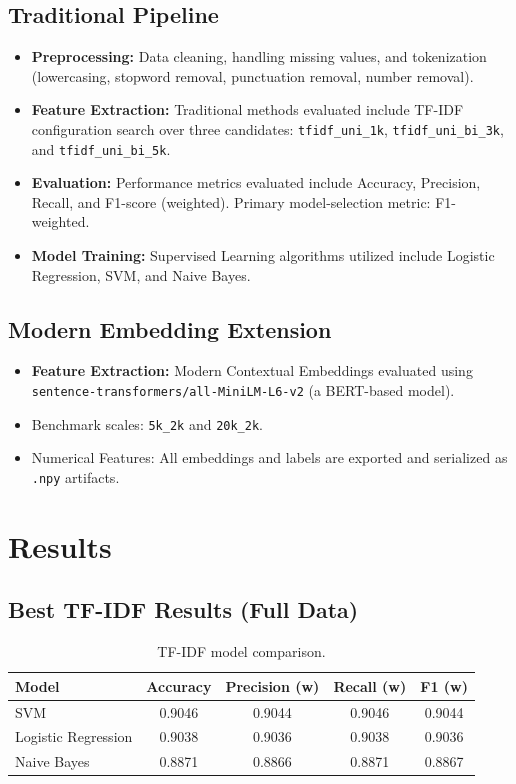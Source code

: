 \documentclass[a4paper,12pt]{article}
\begin{document}
\subsection{Traditional Pipeline}
\begin{itemize}[leftmargin=*]
    \item \textbf{Preprocessing:} Data cleaning, handling missing values, and tokenization (lowercasing, stopword removal, punctuation removal, number removal).
    \item \textbf{Feature Extraction:} Traditional methods evaluated include TF-IDF configuration search over three candidates: \texttt{tfidf\_uni\_1k}, \texttt{tfidf\_uni\_bi\_3k}, and \texttt{tfidf\_uni\_bi\_5k}.
    \item \textbf{Evaluation:} Performance metrics evaluated include Accuracy, Precision, Recall, and F1-score (weighted). Primary model-selection metric: F1-weighted.
    \item \textbf{Model Training:} Supervised Learning algorithms utilized include Logistic Regression, SVM, and Naive Bayes.
\end{itemize}

\subsection{Modern Embedding Extension}
\begin{itemize}[leftmargin=*]
    \item \textbf{Feature Extraction:} Modern Contextual Embeddings evaluated using \texttt{sentence-transformers/all-MiniLM-L6-v2} (a BERT-based model).
    \item Benchmark scales: \texttt{5k\_2k} and \texttt{20k\_2k}.
    \item Numerical Features: All embeddings and labels are exported and serialized as \texttt{.npy} artifacts.
\end{itemize}

\section{Results}
\subsection{Best TF-IDF Results (Full Data)}
\begin{table}[H]
\centering
\begin{tabular}{lcccc}
\toprule
Model & Accuracy & Precision (w) & Recall (w) & F1 (w) \\
\midrule
SVM & 0.9046 & 0.9044 & 0.9046 & 0.9044 \\
Logistic Regression & 0.9038 & 0.9036 & 0.9038 & 0.9036 \\
Naive Bayes & 0.8871 & 0.8866 & 0.8871 & 0.8867 \\
\bottomrule
\end{tabular}
\caption{TF-IDF model comparison.}
\end{table}
\end{document}
